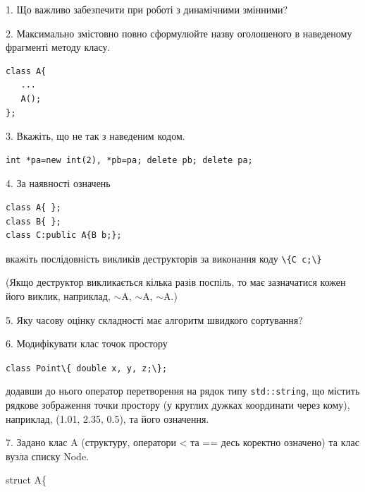 \documentclass[12pt, ukrainian]{article}
\def\code#1{\Verb!#1!}
\begin{document}
{%
1. Що важливо забезпечити при роботі з динамічними змінними?%
\par
\vspace{2mm}
2. Максимально змістовно повно сформулюйте назву оголошеного в наведеному фрагменті методу класу.
\vspace{-3mm}
\begin{verbatim}class A{
   ...
   A();
};\end{verbatim}
\vspace{-3mm}
\par
\vspace{2mm}
3. Вкажіть, що не так з наведеним кодом.
\vspace{-3mm}
\begin{verbatim}int *pa=new int(2), *pb=pa; delete pb; delete pa;\end{verbatim}
\vspace{-3mm}
\par
\vspace{2mm}
4. За наявності означень
\vspace{-3mm}
\begin{verbatim}
class A{ };
class B{ };
class C:public A{B b;};\end{verbatim}
\vspace{-3mm}
вкажіть послідовність викликів деструкторів за виконання коду \code{\{C c;\}} 

(Якщо деструктор викликається кілька разів поспіль, то має зазначатися кожен його виклик, наприклад, $\sim$A, $\sim$A, $\sim$A.)

\vspace{2mm}
5. Яку часову оцінку складності має алгоритм швидкого сортування?
\par
\vspace{2mm}
6. Модифікувати клас точок простору 

\qquad\code{class Point\{ double x, y, z;\};}


додавши до нього оператор перетворення на рядок типу \code{std::string}, що містить рядкове зображення точки простору (у круглих дужках координати через кому), наприклад, (1.01, 2.35, 0.5), та його означення.%
\par
\vspace{2mm}
7. 
Задано клас A (структуру, оператори < та == десь коректно означено) та клас вузла списку Node.

struct A\{

}
\end{document}
